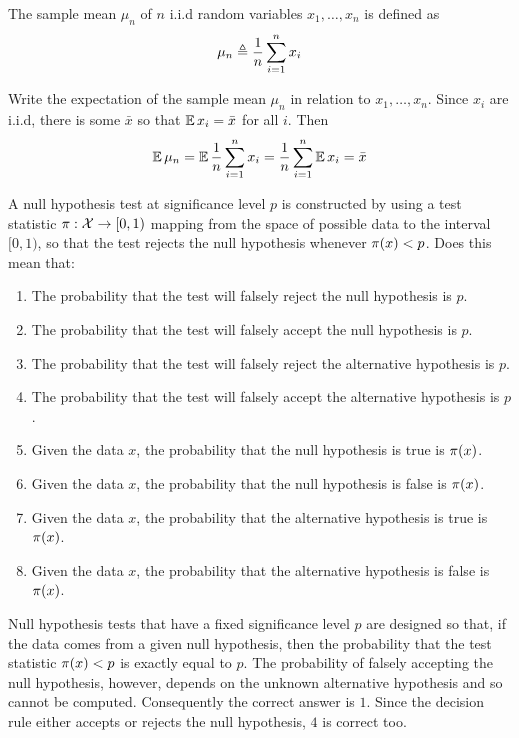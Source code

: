 \documentclass[a4paper]{article}
\def\solution {0}
\begin{document}
\begin{exercise}
  The sample mean $\mu_n$ of $n$  i.i.d random variables $x_1, \ldots, x_n$ is defined as
  \[
  \mu_n \defn
  \ifdefined \solution
  \frac{1}{n} \sum_{i=1}^n x_i
  \else
  \ldots 
  \fi
  \]
\end{exercise}

\begin{exercise}
  Write the expectation of the sample mean $\mu_n$ in relation to $x_1, \ldots, x_n$.
  \ifdefined \solution
  Since $x_i$ are i.i.d, there is some $\bar{x}$ so that $\mathop{\mbox{\ensuremath{\mathbb{E}}}}\nolimits x_i = \bar{x}$ for all $i$. Then
  \fi
  \[
  \E \mu_n =
  \ifdefined \solution
  \E \frac{1}{n} \sum_{i=1}^n x_i
  = \frac{1}{n} \sum_{i=1}^n \E x_i = \bar{x}
  \else
  \ldots
  \fi
  \]

\end{exercise}

\begin{exercise}
  A null hypothesis test at significance level $p$ is constructed by using a test statistic $\pi: {\mathcal{X}} \to [0,1)$ mapping from the space of possible data to the interval $[0,1)$, so that the test rejects the null hypothesis whenever $\pi(x) < p$. Does this mean that:
  \begin{enumerate}
  \item The probability that the test will falsely reject the null hypothesis is $p$.
  \item The probability that the test will falsely accept the null hypothesis is $p$.
  \item The probability that the test will falsely reject the alternative hypothesis is $p$.
  \item The probability that the test will falsely accept the alternative hypothesis is $p$.
  \item Given the data $x$, the probability that the null hypothesis is true is $\pi(x)$.
  \item Given the data $x$, the probability that the null hypothesis is false is $\pi(x)$.
  \item Given the data $x$, the probability that the alternative hypothesis is true is $\pi(x)$.
  \item Given the data $x$, the probability that the alternative hypothesis is false is $\pi(x)$.
  \end{enumerate}
  \end{exercise}
  \ifdefined \solution
  Null hypothesis tests that have a fixed significance level $p$ are designed so that, if the data comes from a given null hypothesis, then the probability that the test statistic $\pi(x) < p$ is exactly equal to $p$. The probability of falsely accepting the null hypothesis, however, depends on the unknown alternative hypothesis and so cannot be computed. Consequently the correct answer is $1$. Since the decision rule either accepts or rejects the null hypothesis, $4$ is correct too.
  \fi
\end{document}
